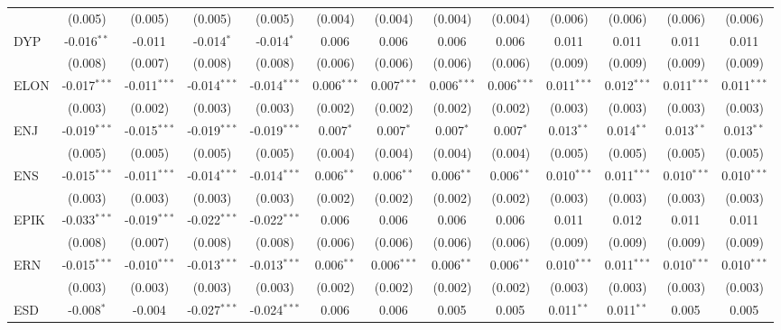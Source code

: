 \begin{table}[!htbp]
\begin{tabular}{@{\extracolsep{5pt}}lcccccccccccc}
  & (0.005) & (0.005) & (0.005) & (0.005) & (0.004) & (0.004) & (0.004) & (0.004) & (0.006) & (0.006) & (0.006) & (0.006) \\
 DYP & -0.016$^{**}$ & -0.011$^{}$ & -0.014$^{*}$ & -0.014$^{*}$ & 0.006$^{}$ & 0.006$^{}$ & 0.006$^{}$ & 0.006$^{}$ & 0.011$^{}$ & 0.011$^{}$ & 0.011$^{}$ & 0.011$^{}$ \\
  & (0.008) & (0.007) & (0.008) & (0.008) & (0.006) & (0.006) & (0.006) & (0.006) & (0.009) & (0.009) & (0.009) & (0.009) \\
 ELON & -0.017$^{***}$ & -0.011$^{***}$ & -0.014$^{***}$ & -0.014$^{***}$ & 0.006$^{***}$ & 0.007$^{***}$ & 0.006$^{***}$ & 0.006$^{***}$ & 0.011$^{***}$ & 0.012$^{***}$ & 0.011$^{***}$ & 0.011$^{***}$ \\
  & (0.003) & (0.002) & (0.003) & (0.003) & (0.002) & (0.002) & (0.002) & (0.002) & (0.003) & (0.003) & (0.003) & (0.003) \\
 ENJ & -0.019$^{***}$ & -0.015$^{***}$ & -0.019$^{***}$ & -0.019$^{***}$ & 0.007$^{*}$ & 0.007$^{*}$ & 0.007$^{*}$ & 0.007$^{*}$ & 0.013$^{**}$ & 0.014$^{**}$ & 0.013$^{**}$ & 0.013$^{**}$ \\
  & (0.005) & (0.005) & (0.005) & (0.005) & (0.004) & (0.004) & (0.004) & (0.004) & (0.005) & (0.005) & (0.005) & (0.005) \\
 ENS & -0.015$^{***}$ & -0.011$^{***}$ & -0.014$^{***}$ & -0.014$^{***}$ & 0.006$^{**}$ & 0.006$^{**}$ & 0.006$^{**}$ & 0.006$^{**}$ & 0.010$^{***}$ & 0.011$^{***}$ & 0.010$^{***}$ & 0.010$^{***}$ \\
  & (0.003) & (0.003) & (0.003) & (0.003) & (0.002) & (0.002) & (0.002) & (0.002) & (0.003) & (0.003) & (0.003) & (0.003) \\
 EPIK & -0.033$^{***}$ & -0.019$^{***}$ & -0.022$^{***}$ & -0.022$^{***}$ & 0.006$^{}$ & 0.006$^{}$ & 0.006$^{}$ & 0.006$^{}$ & 0.011$^{}$ & 0.012$^{}$ & 0.011$^{}$ & 0.011$^{}$ \\
  & (0.008) & (0.007) & (0.008) & (0.008) & (0.006) & (0.006) & (0.006) & (0.006) & (0.009) & (0.009) & (0.009) & (0.009) \\
 ERN & -0.015$^{***}$ & -0.010$^{***}$ & -0.013$^{***}$ & -0.013$^{***}$ & 0.006$^{**}$ & 0.006$^{***}$ & 0.006$^{**}$ & 0.006$^{**}$ & 0.010$^{***}$ & 0.011$^{***}$ & 0.010$^{***}$ & 0.010$^{***}$ \\
  & (0.003) & (0.003) & (0.003) & (0.003) & (0.002) & (0.002) & (0.002) & (0.002) & (0.003) & (0.003) & (0.003) & (0.003) \\
 ESD & -0.008$^{*}$ & -0.004$^{}$ & -0.027$^{***}$ & -0.024$^{***}$ & 0.006$^{}$ & 0.006$^{}$ & 0.005$^{}$ & 0.005$^{}$ & 0.011$^{**}$ & 0.011$^{**}$ & 0.005$^{}$ & 0.005$^{}$ \\

\end{tabular}
\end{table}
